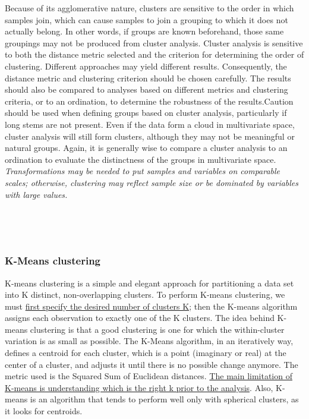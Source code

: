 \documentclass[
]{article}
\begin{document}
Because of its agglomerative nature, clusters are sensitive to the order
in which samples join, which can cause samples to join a grouping to
which it does not actually belong. In other words, if groups are known
beforehand, those same groupings may not be produced from cluster
analysis. Cluster analysis is sensitive to both the distance metric
selected and the criterion for determining the order of clustering.
Different approaches may yield different results. Consequently, the
distance metric and clustering criterion should be chosen carefully. The
results should also be compared to analyses based on different metrics
and clustering criteria, or to an ordination, to determine the
robustness of the results.Caution should be used when defining groups
based on cluster analysis, particularly if long stems are not present.
Even if the data form a cloud in multivariate space, cluster analysis
will still form clusters, although they may not be meaningful or natural
groups. Again, it is generally wise to compare a cluster analysis to an
ordination to evaluate the distinctness of the groups in multivariate
space. \emph{Transformations may be needed to put samples and variables on
comparable scales; otherwise, clustering may reflect sample size or be
dominated by variables with large values.}

~

~

\hypertarget{k-means-clustering}{%
\subsubsection{K-Means clustering}\label{k-means-clustering}}

K-means clustering is a simple and elegant approach for partitioning a
data set into K distinct, non-overlapping clusters. To perform K-means
clustering, we must \ul{first specify the desired number of clusters
K}; then the K-means algorithm assigns each observation to
exactly one of the K clusters. The idea behind K-means clustering is
that a good clustering is one for which the within-cluster variation is
as small as possible. The K-Means algorithm, in an iteratively way,
defines a centroid for each cluster, which is a point (imaginary or
real) at the center of a cluster, and adjusts it until there is no
possible change anymore. The metric used is the Squared Sum of Euclidean
distances. \ul{The main limitation of K-means is understanding which is the
right k prior to the analysis}. Also, K-means is an
algorithm that tends to perform well only with spherical clusters, as it
looks for centroids.
\end{document}
